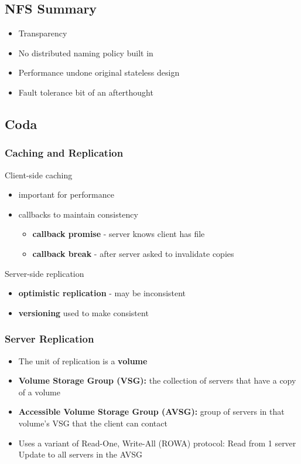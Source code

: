 \subsection{NFS Summary}
\begin{itemize}
	\item Transparency
	\item No distributed naming policy built in
	\item Performance undone original stateless design
	\item Fault tolerance bit of an afterthought	
\end{itemize}

\subsection{Coda}
\subsubsection{Caching and Replication}
Client-side caching
\begin{itemize}
	\item important for performance
	\item callbacks to maintain consistency
	\begin{itemize}
		\item \textbf{callback promise} - server knows client has file
		\item \textbf{callback break} - after server asked to invalidate copies
	\end{itemize}	
\end{itemize}
Server-side replication
\begin{itemize}
	\item \textbf{optimistic replication} - may be inconsistent
	\item \textbf{versioning} used to make consistent	
\end{itemize}

\subsubsection{Server Replication}
\begin{itemize}
	\item The unit of replication is a \textbf{volume}
	\item \textbf{Volume Storage Group (VSG):} the collection of servers that have a copy of a volume
	\item \textbf{Accessible Volume Storage Group (AVSG):} group of servers in that volume's VSG that the client can contact
	\item Uses a variant of Read-One, Write-All (ROWA) protocol:
	\subitem Read from 1 server
	\subitem Update to all servers in the AVSG	
\end{itemize}

